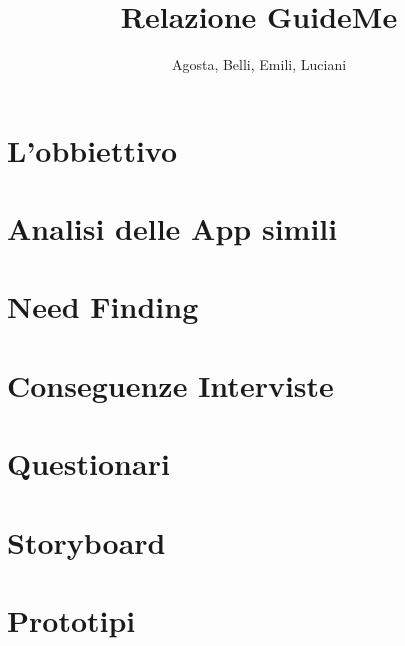 \documentclass[12pt]{article}\pagestyle{myheadings}
\date{}
\title{\textbf{\huge{Relazione GuideMe}}}
\author{Agosta, Belli, Emili, Luciani}
\newcounter{interview}
\begin{document}
\clearpage\maketitle

\thispagestyle{empty}
\clearpage

\thispagestyle{empty}
\tableofcontents

\clearpage

\section{L'obbiettivo}


\clearpage

\section{Analisi delle App simili}


\clearpage

\section{Need Finding}


\clearpage

\section{Conseguenze Interviste}


\clearpage

\section{Questionari}


\clearpage

\section{Storyboard}


\clearpage

\section{Prototipi}


\clearpage
\end{document}
